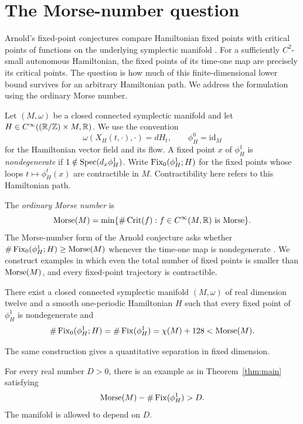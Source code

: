 \section{The Morse-number question}\label{sec:introduction}
Arnold's fixed-point conjectures compare Hamiltonian fixed points with
critical points of functions on the underlying symplectic manifold
\cite[Section~2]{Arnold1986}. For a sufficiently $C^2$-small autonomous Hamiltonian,
the fixed points of its time-one map are precisely its critical points.
The question is how much of this finite-dimensional lower bound survives
for an arbitrary Hamiltonian path. We address the formulation using the
ordinary Morse number.

Let $(M,\omega)$ be a closed connected symplectic manifold and let
$H\in C^\infty((\mathbb R/\mathbb Z)\times M,\mathbb R)$. We use the convention
\[
 \omega(X_H(t,\cdot),\cdot)=dH_t,
 \qquad \phi_H^0=\mathrm{id}_M
\]
for the Hamiltonian vector field and its flow. A fixed point $x$ of
$\phi_H^1$ is \emph{nondegenerate} if
$1\notin\operatorname{Spec}(d_x\phi_H^1)$. Write $\operatorname{Fix}_0(\phi_H^1;H)$ for the fixed
points whose loops $t\mapsto\phi_H^t(x)$ are contractible in $M$.
Contractibility here refers to this Hamiltonian path.

The \emph{ordinary Morse number} is
\[
 \operatorname{Morse}(M)=\min\{\#\operatorname{Crit}(f):f\in C^\infty(M,\mathbb R)\text{ is Morse}\}.
\]
The Morse-number form of the Arnold conjecture asks whether
$\#\operatorname{Fix}_0(\phi_H^1;H)\ge\operatorname{Morse}(M)$ whenever the time-one map is
nondegenerate \cite[Conjecture~1.1]{Golovko2020}.
We construct examples in which even the total number of fixed points is
smaller than $\operatorname{Morse}(M)$, and every fixed-point trajectory is contractible.

\begin{theorem}\label{thm:main}
There exist a closed connected symplectic manifold $(M,\omega)$ of real
dimension twelve and a smooth one-periodic Hamiltonian $H$ such that every
fixed point of $\phi_H^1$ is nondegenerate and
\[
\#\operatorname{Fix}_0(\phi_H^1;H)=\#\operatorname{Fix}(\phi_H^1)
                   =\chi(M)+128<\operatorname{Morse}(M).
\]
\end{theorem}

The same construction gives a quantitative separation in fixed dimension.
\begin{corollary}\label{cor:deficit}
For every real number $D>0$, there is an example as in
Theorem~\ref{thm:main} satisfying
\[
 \operatorname{Morse}(M)-\#\operatorname{Fix}(\phi_H^1)>D.
\]
The manifold is allowed to depend on $D$.
\end{corollary}

